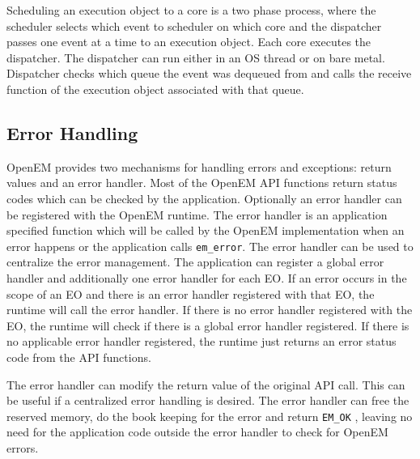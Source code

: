 Scheduling an execution object to a core is a two phase process, where the scheduler selects which event to scheduler on which core and the dispatcher passes one event at a time to an execution object. Each core executes the dispatcher. The dispatcher can run either in an OS thread or on bare metal. Dispatcher checks which queue the event was dequeued from and calls the receive function of the execution object associated with that queue.~\cite{openemintro}

\subsection{Error Handling}
\label{subsec:error}
OpenEM provides two mechanisms for handling errors and exceptions: return values and an error handler. Most of the OpenEM API functions return status codes which can be checked by the application. \cite{openempage} Optionally an error handler can be registered with the OpenEM runtime. The error handler is an application specified function which will be called by the OpenEM implementation when an error happens or the application calls \texttt{em\_error}. The error handler can be used to centralize the error management. The application can register a global error handler and additionally one error handler for each EO. If an error occurs in the scope of an EO and there is an error handler registered with that EO, the runtime will call the error handler. If there is no error handler registered with the EO, the runtime will check if there is a global error handler registered. If there is no applicable error handler registered, the runtime just returns an error status code from the API functions. \cite{openempage}

The error handler can modify the return value of the original API call. This can be useful if a centralized error handling is desired. The error handler can free the reserved memory, do the book keeping for the error and return \texttt{EM\_OK} , leaving no need for the application code outside the error handler to check for OpenEM errors. \cite{openempage}

